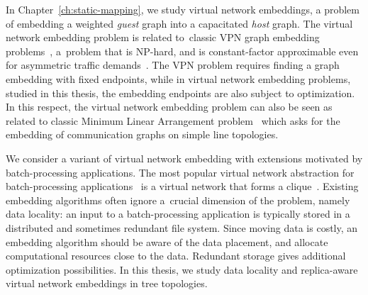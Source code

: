 \medskip

In Chapter~\ref{ch:static-mapping}, we study virtual network embeddings, a problem of embedding a weighted \emph{guest} graph into a capacitated \emph{host} graph.
The virtual network embedding problem is related to~classic VPN graph embedding problems~\cite{gupta2001provisioning,vpn1, vpn2, Goyal2008},
a~problem that is NP-hard, and is constant-factor approximable even for asymmetric traffic demands~\cite{vpn-apx}.
The VPN problem requires finding a graph embedding with fixed endpoints, while in virtual network embedding problems, studied in this thesis, the embedding endpoints are also subject to optimization.
In this respect, the virtual network embedding problem can also be seen as related to
classic Minimum Linear Arrangement problem~\cite{EvNaRS99,ord-prob} which asks for the
embedding of communication graphs on simple line topologies.

We consider a variant of virtual network embedding with extensions motivated by batch-processing applications.
The most popular virtual network abstraction for batch-processing applications~\cite{mapreduce} is a virtual network that forms a clique~\cite{oktopus,MogPop12,infocom16,ccr15emb,proteus}.
Existing embedding algorithms often ignore a~crucial dimension of the problem, namely data locality:
an input to a batch-processing application is typically stored in a distributed
and sometimes redundant file system. Since moving
data is costly, an embedding algorithm should be aware of the data placement,
and allocate computational resources close to the data.
Redundant storage gives additional optimization possibilities.
In this thesis, we study data locality and replica-aware virtual network embeddings in tree topologies.

\medskip

